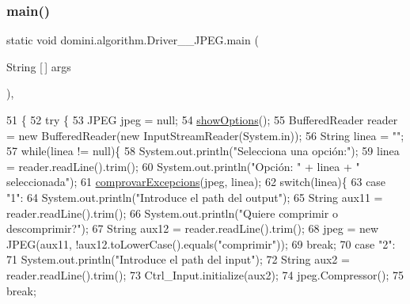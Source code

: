 \subsubsection{\texorpdfstring{main()}{main()}}
{\footnotesize\ttfamily static void domini.\+algorithm.\+Driver\+\_\+\+\_\+\+J\+P\+E\+G.\+main (\begin{DoxyParamCaption}\item[{String \mbox{[}$\,$\mbox{]}}]{args }\end{DoxyParamCaption})\hspace{0.3cm}{\ttfamily [inline]}, {\ttfamily [static]}}


\begin{DoxyCode}
51                                            \{
52     \textcolor{keywordflow}{try} \{
53         JPEG jpeg = null;
54         \hyperlink{classdomini_1_1algorithm_1_1Driver____JPEG_a62ce35e061afe893bd03af9bfff41c33}{showOptions}();
55         BufferedReader reader = \textcolor{keyword}{new} BufferedReader(\textcolor{keyword}{new} InputStreamReader(System.in));
56         String linea = \textcolor{stringliteral}{""};
57         \textcolor{keywordflow}{while}(linea != null)\{
58             System.out.println(\textcolor{stringliteral}{"Selecciona una opción:"});
59             linea = reader.readLine().trim();
60             System.out.println(\textcolor{stringliteral}{"Opción: "} + linea + \textcolor{stringliteral}{" seleccionada"});
61             \hyperlink{classdomini_1_1algorithm_1_1Driver____JPEG_ae75883665dbbf55adaa8db46f2211c75}{comprovarExcepcions}(jpeg, linea);
62             \textcolor{keywordflow}{switch}(linea)\{
63                 \textcolor{keywordflow}{case} \textcolor{stringliteral}{"1"}:
64                     System.out.println(\textcolor{stringliteral}{"Introduce el path del output"});
65                     String aux11 = reader.readLine().trim();
66                     System.out.println(\textcolor{stringliteral}{"Quiere comprimir o descomprimir?"});
67                     String aux12 = reader.readLine().trim();
68                     jpeg = \textcolor{keyword}{new} JPEG(aux11, !aux12.toLowerCase().equals(\textcolor{stringliteral}{"comprimir"}));
69                 \textcolor{keywordflow}{break};
70                 \textcolor{keywordflow}{case} \textcolor{stringliteral}{"2"}:
71                     System.out.println(\textcolor{stringliteral}{"Introduce el path del input"});
72                     String aux2 = reader.readLine().trim();
73                     Ctrl\_Input.initialize(aux2);
74                     jpeg.Compressor();
75                 \textcolor{keywordflow}{break};

\end{DoxyCode}
